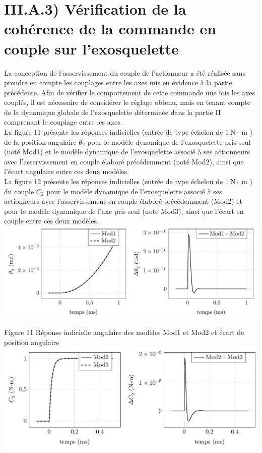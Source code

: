 \documentclass[10pt]{article}
\begin{document}
\section*{III.A.3) Vérification de la cohérence de la commande en couple sur l'exosquelette}
La conception de l'asservissement du couple de l'actionneur a été réalisée sans prendre en compte les couplages entre les axes mis en évidence à la partie précédente. Afin de vérifier le comportement de cette commande une fois les axes couplés, il est nécessaire de considérer le réglage obtenu, mais en tenant compte de la dynamique globale de l'exosquelette déterminée dans la partie II comprenant le couplage entre les axes.\\
La figure 11 présente les réponses indicielles (entrée de type échelon de $1 \mathrm{~N} \cdot \mathrm{~m}$ ) de la position angulaire $\theta_{2}$ pour le modèle dynamique de l'exosquelette pris seul (noté Mod1) et le modèle dynamique de l'exosquelette associé à ses actionneurs avec l'asservissement en couple élaboré précédemment (noté Mod2), ainsi que l'écart angulaire entre ces deux modèles.\\
La figure 12 présente les réponses indicielles (entrée de type échelon de $1 \mathrm{~N} \cdot \mathrm{~m}$ ) du couple $C_{2}$ pour le modèle dynamique de l'exosquelette associé à ses actionneurs avec l'asservissement en couple élaboré précédemment (Mod2) et pour le modèle dynamique de l'axe pris seul (noté Mod3), ainsi que l'écart en couple entre ces deux modèles.\\
\includegraphics[max width=\textwidth, center]{2025_07_03_97545f5dc188959e5663g-09}

Figure 11 Réponse indicielle angulaire des modèles Mod1 et Mod2 et écart de position angulaire\\
\includegraphics[max width=\textwidth, center]{2025_07_03_97545f5dc188959e5663g-09(1)}
\end{document}
